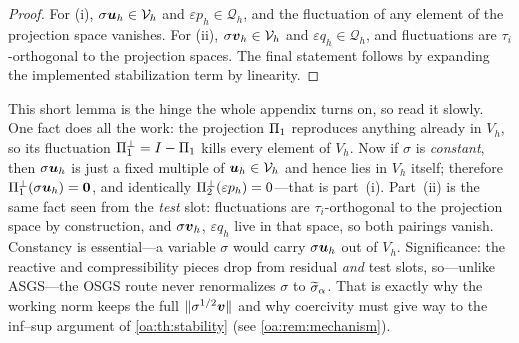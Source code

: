 \begin{proof}
For (i), $\sigma\boldsymbol{u}_h \in \mathcal{V}_h$ and $\varepsilon p_h \in \mathcal{Q}_h$, and the fluctuation of
any element of the projection space vanishes. For (ii), $\sigma\boldsymbol{v}_h \in \mathcal{V}_h$ and
$\varepsilon q_h \in \mathcal{Q}_h$, and fluctuations are $\tau_i$-orthogonal to the projection
spaces. The final statement follows by expanding the implemented stabilization
term by linearity.
\end{proof}

\begin{pedagogy}
This short lemma is the hinge the whole appendix turns on, so read it slowly. One
fact does all the work: the projection $\Pi_{1}$ reproduces anything already in $V_h$,
so its fluctuation $\Pi_{1}^{\perp} = I - \Pi_{1}$ kills every element of $V_h$. Now if $\sigma$
is \emph{constant}, then $\sigma\boldsymbol{u}_h$ is just a fixed multiple of $\boldsymbol{u}_h \in \mathcal{V}_h$ and
hence lies in $V_h$ itself; therefore $\Pi_{1}^{\perp}(\sigma\boldsymbol{u}_h) = \boldsymbol{0}$, and
identically $\Pi_{2}^{\perp}(\varepsilon p_h) = 0$---that is part~(i). Part~(ii) is the same
fact seen from the \emph{test} slot: fluctuations are $\tau_i$-orthogonal to the
projection space by construction, and $\sigma\boldsymbol{v}_h$, $\varepsilon q_h$ live in that
space, so both pairings vanish. Constancy is essential---a variable $\sigma$ would
carry $\sigma\boldsymbol{u}_h$ out of $V_h$. Significance: the reactive and compressibility
pieces drop from residual \emph{and} test slots, so---unlike ASGS---the OSGS route
never renormalizes $\sigma$ to $\widetilde{\sigma}_{\alpha}$. That is exactly why the working norm
keeps the full $\lVert \sigma^{1/2}\boldsymbol{v} \rVert$ and why coercivity must give way to the
inf--sup argument of \cref{oa:th:stability} (see \cref{oa:rem:mechanism}).
\end{pedagogy}

